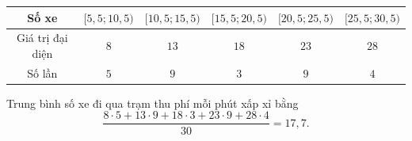 \begin{ex}
{\begin{enumerate}
			\begin{center}
				\begin{tabular}{|c|c|c|c|c|c|}
					\hline 
					Số  xe & $[5{,}5;10{,}5)$ & $[10{,}5;15{,}5)$ & $[15{,}5;20{,}5)$ & $[20{,}5;25{,}5)$ & $[25{,}5;30{,}5)$ \\
					 \hline
					Giá trị đại  diện & $8$ & $13$ & $18$ & $23$ & $28$ \\
					\hline 
					Số lần & $5$ & $9$ & $3$ & $9$ & $4$  \\
					 \hline
				\end{tabular}
			\end{center}
			Trung bình số xe  đi qua trạm thu phí mỗi phút xấp xỉ bằng
			\[\dfrac{8\cdot 5+13\cdot 9+18\cdot 3+23\cdot 9+28\cdot  4}{30}=17{,}7.\]
		\end{enumerate}
	} 
\end{ex}

